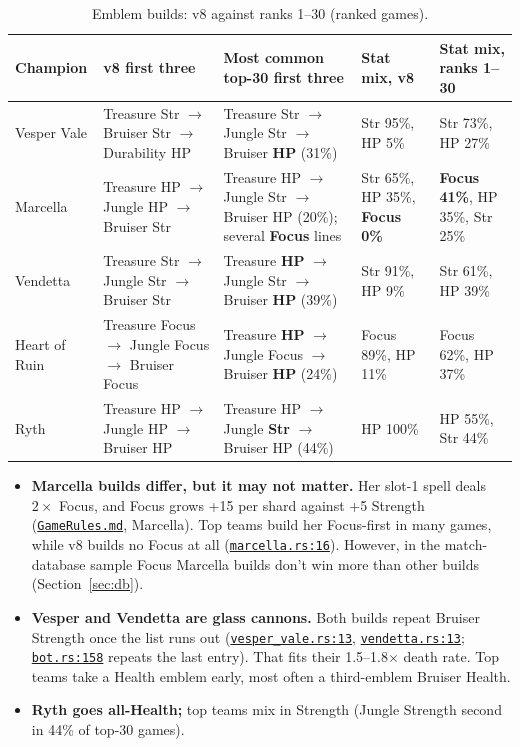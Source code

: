 \documentclass[11pt,a4paper]{article}
\newcommand{\repo}{file:///Users/tristanbasri/Desktop/Code/cambridge-battlecode-s2}
\newcommand{\code}[2]{\href{\repo/#1}{\texttt{\textcolor{cOurs!80!black}{#2}}}}
\newcommand{\veight}{bots/bot-v8/src}
\newcommand{\HP}{\textbf{HP}}
\begin{document}
\begin{table}[H]
\centering\footnotesize
\begin{tabularx}{\linewidth}{l>{\raggedright\arraybackslash}X>{\raggedright\arraybackslash}X>{\raggedright\arraybackslash}p{2.2cm}>{\raggedright\arraybackslash}p{2.4cm}}
\toprule
Champion & v8 first three & Most common top-30 first three & Stat mix, v8 & Stat mix, ranks 1--30 \\
\midrule
Vesper Vale & Treasure Str $\to$ Bruiser Str $\to$ Durability HP & Treasure Str $\to$ Jungle Str $\to$ Bruiser \HP{} (31\%) & Str 95\%, HP 5\% & Str 73\%, HP 27\% \\
Marcella & Treasure HP $\to$ Jungle HP $\to$ Bruiser Str & Treasure HP $\to$ Jungle Str $\to$ Bruiser HP (20\%); several \textbf{Focus} lines & Str 65\%, HP 35\%, \textbf{Focus 0\%} & \textbf{Focus 41\%}, HP 35\%, Str 25\% \\
Vendetta & Treasure Str $\to$ Jungle Str $\to$ Bruiser Str & Treasure \HP{} $\to$ Jungle Str $\to$ Bruiser \HP{} (39\%) & Str 91\%, HP 9\% & Str 61\%, HP 39\% \\
Heart of Ruin & Treasure Focus $\to$ Jungle Focus $\to$ Bruiser Focus & Treasure \HP{} $\to$ Jungle Focus $\to$ Bruiser \HP{} (24\%) & Focus 89\%, HP 11\% & Focus 62\%, HP 37\% \\
Ryth & Treasure HP $\to$ Jungle HP $\to$ Bruiser HP & Treasure HP $\to$ Jungle \textbf{Str} $\to$ Bruiser HP (44\%) & HP 100\% & HP 55\%, Str 44\% \\
\bottomrule
\end{tabularx}
\caption{Emblem builds: v8 against ranks 1--30 (ranked games).}
\label{tab:builds}
\end{table}

\begin{itemize}
  \item \textbf{Marcella builds differ, but it may not matter.} Her slot-1 spell deals $2\times$ Focus, and Focus grows +15 per shard against +5 Strength (\code{docs/GameRules.md}{GameRules.md}, Marcella). Top teams build her Focus-first in many games, while v8 builds no Focus at all (\code{\veight/champions/marcella.rs}{marcella.rs:16}). However, in the match-database sample Focus Marcella builds don't win more than other builds (Section~\ref{sec:db}).
  \item \textbf{Vesper and Vendetta are glass cannons.} Both builds repeat Bruiser Strength once the list runs out (\code{\veight/champions/vesper\_vale.rs}{vesper\_vale.rs:13}, \code{\veight/champions/vendetta.rs}{vendetta.rs:13}; \code{\veight/bot.rs}{bot.rs:158} repeats the last entry). That fits their 1.5--1.8$\times$ death rate. Top teams take a Health emblem early, most often a third-emblem Bruiser Health.
  \item \textbf{Ryth goes all-Health;} top teams mix in Strength (Jungle Strength second in 44\% of top-30 games).
\end{itemize}
\end{document}
